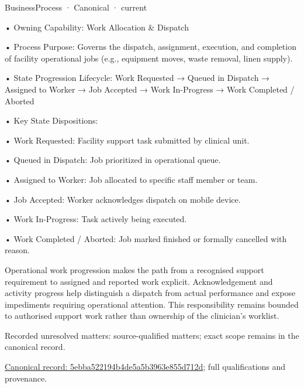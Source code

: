 \label{element:5ebba522194b4de5a5b3963e855d712d}
{\small BusinessProcess · Canonical · current}\par

•
Owning Capability: Work Allocation \& Dispatch



•
Process Purpose: Governs the dispatch, assignment, execution, and completion of facility operational jobs (e.g., equipment moves, waste removal, linen supply).



•
State Progression Lifecycle: Work Requested → Queued in Dispatch → Assigned to Worker → Job Accepted → Work In-Progress → Work Completed / Aborted



•
Key State Dispositions:



•
Work Requested: Facility support task submitted by clinical unit.



•
Queued in Dispatch: Job prioritized in operational queue.



•
Assigned to Worker: Job allocated to specific staff member or team.



•
Job Accepted: Worker acknowledges dispatch on mobile device.



•
Work In-Progress: Task actively being executed.



•
Work Completed / Aborted: Job marked finished or formally cancelled with reason.



Operational work progression makes the path from a recognised support requirement to assigned and reported work explicit. Acknowledgement and activity progress help distinguish a dispatch from actual performance and expose impediments requiring operational attention. This responsibility remains bounded to authorised support work rather than ownership of the clinician's worklist.


{\small Recorded unresolved matters: source-qualified matters; exact scope remains in the canonical record.}\par
{\footnotesize \href{../../../../continuum/business/business-process/5ebba522194b4de5a5b3963e855d712d.md}{Canonical record: 5ebba522194b4de5a5b3963e855d712d}; full qualifications and provenance.}\par
